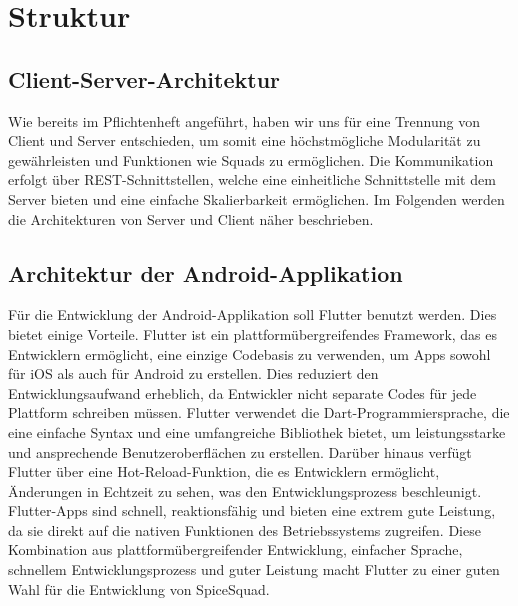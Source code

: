 \documentclass{entwurfsheft}
\begin{document}
\section{Struktur}

\subsection{Client-Server-Architektur}
Wie bereits im Pflichtenheft angeführt, haben wir uns für eine Trennung von Client und Server entschieden, um somit eine höchstmögliche Modularität zu gewährleisten und
Funktionen wie Squads zu ermöglichen. Die Kommunikation erfolgt über REST-Schnittstellen, welche eine einheitliche Schnittstelle mit dem Server bieten und eine einfache Skalierbarkeit ermöglichen.
Im Folgenden werden die Architekturen von Server und Client näher beschrieben.

\subsection{Architektur der Android-Applikation}
Für die Entwicklung der Android-Applikation soll Flutter benutzt werden. Dies bietet einige Vorteile. Flutter ist ein plattformübergreifendes Framework, das es Entwicklern ermöglicht, eine einzige Codebasis zu verwenden, um Apps sowohl für iOS als auch für Android zu erstellen. Dies reduziert den Entwicklungsaufwand erheblich, da Entwickler nicht separate Codes für jede Plattform schreiben müssen. Flutter verwendet die Dart-Programmiersprache, die eine einfache Syntax und eine umfangreiche Bibliothek bietet, um leistungsstarke und ansprechende Benutzeroberflächen zu erstellen. Darüber hinaus verfügt Flutter über eine Hot-Reload-Funktion, die es Entwicklern ermöglicht, Änderungen in Echtzeit zu sehen, was den Entwicklungsprozess beschleunigt. Flutter-Apps sind schnell, reaktionsfähig und bieten eine extrem gute Leistung, da sie direkt auf die nativen Funktionen des Betriebssystems zugreifen. Diese Kombination aus plattformübergreifender Entwicklung, einfacher Sprache, schnellem Entwicklungsprozess und guter Leistung macht Flutter zu einer guten Wahl für die Entwicklung von SpiceSquad.
\end{document}
